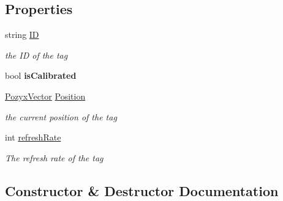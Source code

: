 \subsection*{Properties}
\begin{DoxyCompactItemize}
\item 
string \hyperlink{class_pozyx_positioner_1_1_framework_1_1_tag_a0d75eeca4dea7088e2b4a60230c13012}{ID}
\begin{DoxyCompactList}\small\item\em the ID of the tag \end{DoxyCompactList}\item 
\mbox{\label{class_pozyx_positioner_1_1_framework_1_1_tag_a02cdde9c3303a18f28453056939bf045}} 
bool {\bfseries is\+Calibrated}
\item 
\hyperlink{struct_pozyx_positioner_1_1_framework_1_1_pozyx_vector}{Pozyx\+Vector} \hyperlink{class_pozyx_positioner_1_1_framework_1_1_tag_a0b1b836b4e64ae70171587a2bcde4d71}{Position}
\begin{DoxyCompactList}\small\item\em the current position of the tag \end{DoxyCompactList}\item 
int \hyperlink{class_pozyx_positioner_1_1_framework_1_1_tag_a9010e57016df0a932c5ce8f8584ff5f9}{refresh\+Rate}
\begin{DoxyCompactList}\small\item\em The refresh rate of the tag \end{DoxyCompactList}\end{DoxyCompactItemize}


\subsection{Constructor \& Destructor Documentation}
\mbox{\label{class_pozyx_positioner_1_1_framework_1_1_tag_a9b58a1a5756bf3c8cda1e2afd32276b2}} 
